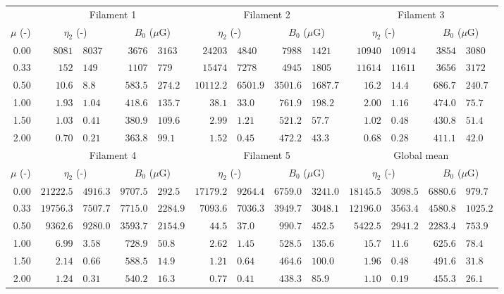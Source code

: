 \begin{tabular}{@{}rr@{ $\pm$ }lr@{ $\pm$ }lr@{ $\pm$ }lr@{ $\pm$ }lr@{ $\pm$ }lr@{ $\pm$ }l@{}}
\toprule
{} & \multicolumn{4}{c}{Filament 1}
   & \multicolumn{4}{c}{Filament 2}
   & \multicolumn{4}{c}{Filament 3} \\
\cmidrule(lr){2-5} \cmidrule(lr){6-9} \cmidrule(lr){10-13}
$\mu$ (-) & \multicolumn{2}{c}{$\eta_2$ (-)} & \multicolumn{2}{c}{$B_0$ ($\mu$G)}
          & \multicolumn{2}{c}{$\eta_2$ (-)} & \multicolumn{2}{c}{$B_0$ ($\mu$G)}
          & \multicolumn{2}{c}{$\eta_2$ (-)} & \multicolumn{2}{c}{$B_0$ ($\mu$G)} \\
\cmidrule{1-13}
0.00 & $8081$ & $8037$ & $3676$ & $3163$
     & $24203$ & $4840$ & $7988$ & $1421$
     & $10940$ & $10914$ & $3854$ & $3080$ \\
0.33 & $152$ & $149$ & $1107$ & $779$
     & $15474$ & $7278$ & $4945$ & $1805$
     & $11614$ & $11611$ & $3656$ & $3172$ \\
0.50 & $10.6$ & $8.8$ & $583.5$ & $274.2$
     & $10112.2$ & $6501.9$ & $3501.6$ & $1687.7$
     & $16.2$ & $14.4$ & $686.7$ & $240.7$ \\
1.00 & $1.93$ & $1.04$ & $418.6$ & $135.7$
     & $38.1$ & $33.0$ & $761.9$ & $198.2$
     & $2.00$ & $1.16$ & $474.0$ & $75.7$ \\
1.50 & $1.03$ & $0.41$ & $380.9$ & $109.6$
     & $2.99$ & $1.21$ & $521.2$ & $57.7$
     & $1.02$ & $0.48$ & $430.8$ & $51.4$ \\
2.00 & $0.70$ & $0.21$ & $363.8$ & $99.1$
     & $1.52$ & $0.45$ & $472.2$ & $43.3$
     & $0.68$ & $0.28$ & $411.1$ & $42.0$ \\

\midrule
{} & \multicolumn{4}{c}{Filament 4}
   & \multicolumn{4}{c}{Filament 5}
   & \multicolumn{4}{c}{Global mean} \\
\cmidrule(lr){2-5} \cmidrule(lr){6-9} \cmidrule(lr){10-13}
$\mu$ (-) & \multicolumn{2}{c}{$\eta_2$ (-)} & \multicolumn{2}{c}{$B_0$ ($\mu$G)}
          & \multicolumn{2}{c}{$\eta_2$ (-)} & \multicolumn{2}{c}{$B_0$ ($\mu$G)}
          & \multicolumn{2}{c}{$\eta_2$ (-)} & \multicolumn{2}{c}{$B_0$ ($\mu$G)} \\
\cmidrule{1-13}
0.00 & $21222.5$ & $4916.3$ & $9707.5$ & $292.5$
     & $17179.2$ & $9264.4$ & $6759.0$ & $3241.0$
     & $18145.5$ & $3098.5$ & $6880.6$ & $979.7$ \\
0.33 & $19756.3$ & $7507.7$ & $7715.0$ & $2284.9$
     & $7093.6$ & $7036.3$ & $3949.7$ & $3048.1$
     & $12196.0$ & $3563.4$ & $4580.8$ & $1025.2$ \\
0.50 & $9362.6$ & $9280.0$ & $3593.7$ & $2154.9$
     & $44.5$ & $37.0$ & $990.7$ & $452.5$
     & $5422.5$ & $2941.2$ & $2283.4$ & $753.9$ \\
1.00 & $6.99$ & $3.58$ & $728.9$ & $50.8$
     & $2.62$ & $1.45$ & $528.5$ & $135.6$
     & $15.7$ & $11.6$ & $625.6$ & $78.4$ \\
1.50 & $2.14$ & $0.66$ & $588.5$ & $14.9$
     & $1.21$ & $0.64$ & $464.6$ & $100.0$
     & $1.96$ & $0.48$ & $491.6$ & $31.8$ \\
2.00 & $1.24$ & $0.31$ & $540.2$ & $16.3$
     & $0.77$ & $0.41$ & $438.3$ & $85.9$
     & $1.10$ & $0.19$ & $455.3$ & $26.1$ \\
\bottomrule
\end{tabular}
